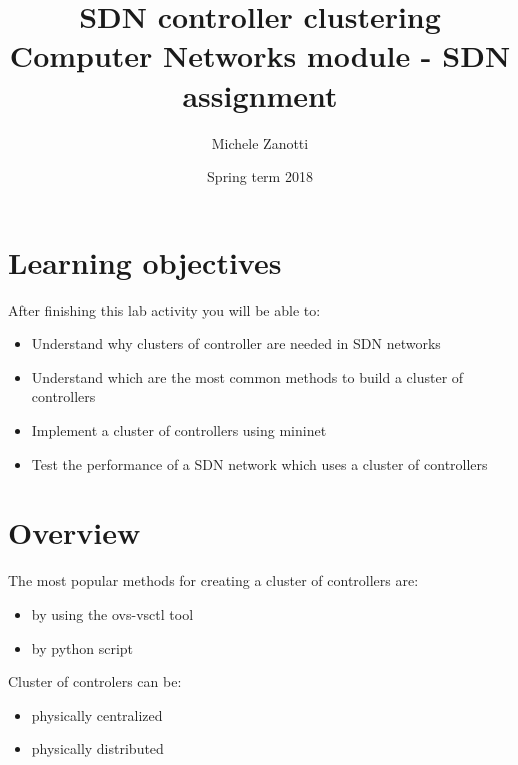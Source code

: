\documentclass[12pt, a4paper]{article}
\title{SDN controller clustering \\ \large Computer Networks module - SDN assignment}
\author{Michele Zanotti}
\date{Spring term 2018}
\begin{document}
\maketitle

\section*{Learning objectives}
After finishing this lab activity you will be able to:
\begin{itemize}
  \item Understand why clusters of controller are needed in SDN networks
  \item Understand which are the most common methods to build a cluster of controllers
  \item Implement a cluster of controllers using mininet
  \item Test the performance of a SDN network which uses a cluster of controllers
\end{itemize}


\section*{Overview}
The most popular methods for creating a cluster of controllers are:
\begin{itemize}
  \item by using the ovs-vsctl tool
  \item by python script
\end{itemize}
Cluster of controlers can be:
\begin{itemize}
  \item physically centralized
  \item physically distributed
\end{itemize}



\end{document}
